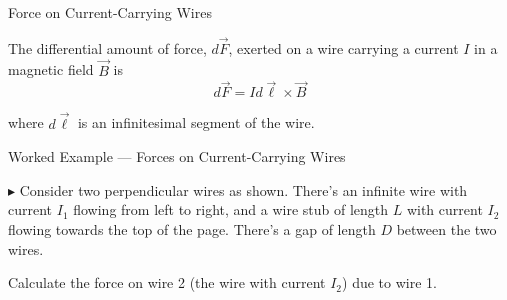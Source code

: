 \documentclass{beamer}
\begin{document}
\begin{frame}{Force on Current-Carrying Wires}

The differential amount of force, $d\vec{F}$, exerted on a wire carrying a current $I$ in a magnetic field $\vec{B}$ is
\begin{equation*}
    d\vec{F} = Id\vec{\ell} \times \vec{B}
\end{equation*}

where $d\vec{\ell}$ is an infinitesimal segment of the wire.

\end{frame}

\begin{frame}{Worked Example --- Forces on Current-Carrying Wires}

$\blacktriangleright$ Consider two perpendicular wires as shown. There's an infinite wire with current $I_1$ flowing from left to right, and a wire stub of length $L$ with current $I_2$ flowing towards the top of the page. There's a gap of length $D$ between the two wires.

\begin{figure}[H]
\centering
{}
\end{figure}

Calculate the force on wire 2 (the wire with current $I_2$) due to wire 1.

\end{frame}
\end{document}
